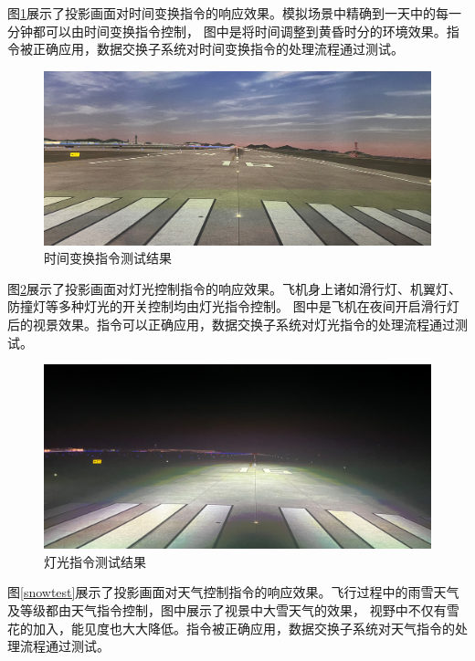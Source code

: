\par
图\ref{todtest}展示了投影画面对时间变换指令的响应效果。模拟场景中精确到一天中的每一分钟都可以由时间变换指令控制，
图中是将时间调整到黄昏时分的环境效果。指令被正确应用，数据交换子系统对时间变换指令的处理流程通过测试。

\begin{figure}[h!]
    \begin{center}
        \includegraphics[width=.9\textwidth]{pictures/todtest.jpg}
        \caption{时间变换指令测试结果}
        \label{todtest}
    \end{center}
\end{figure}
\par
图\ref{lighttest}展示了投影画面对灯光控制指令的响应效果。飞机身上诸如滑行灯、机翼灯、防撞灯等多种灯光的开关控制均由灯光指令控制。
图中是飞机在夜间开启滑行灯后的视景效果。指令可以正确应用，数据交换子系统对灯光指令的处理流程通过测试。
\begin{figure}[h!]
    \begin{center}
        \includegraphics[width=.9\textwidth]{pictures/lighttest.jpg}
        \caption{灯光指令测试结果}
        \label{lighttest}
    \end{center}
\end{figure}
\par
图\ref{snowtest}展示了投影画面对天气控制指令的响应效果。飞行过程中的雨雪天气及等级都由天气指令控制，图中展示了视景中大雪天气的效果，
视野中不仅有雪花的加入，能见度也大大降低。指令被正确应用，数据交换子系统对天气指令的处理流程通过测试。
